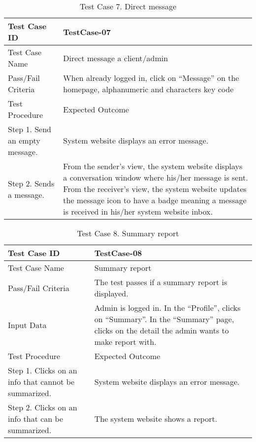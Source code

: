 \begin{table}[h!]   %
\centering
\caption{Test Case 7. Direct message} \vspace{0.25em}
\begin{tabular}{|p{2in}|p{4in}|} \hline
\centering 
Test Case ID & TestCase-07 \\ \hline
Test Case Name       &   Direct message a client/admin      \\ \hline
Pass/Fail Criteria       &   When already logged in, click on “Message” on the homepage, alphanumeric and characters key code    \\ \hline
Test Procedure   & Expected Outcome  \\ \hline
Step 1. Send an empty message.           &  System website displays an error message.      \\ \hline
Step 2. Sends a message.    & 	From the sender’s view, the system website displays a conversation window where his/her message is sent. From the receiver’s view, the system website updates the message icon to have a badge meaning a message is received in his/her system website inbox.     \\ \hline
\end{tabular}
\label{tab:test7}
\end{table}


\begin{table}[h!]   %
\centering
\caption{Test Case 8. Summary report} \vspace{0.25em}
\begin{tabular}{|p{2in}|p{4in}|} \hline
\centering 
Test Case ID & TestCase-08 \\ \hline
Test Case Name       &   Summary report       \\ \hline
Pass/Fail Criteria       &   The test passes if a summary report is displayed.    \\ \hline
Input Data  & Admin is logged in. In the “Profile”, clicks on “Summary”. In the “Summary” page, clicks on the detail the admin wants to make report with.    \\ \hline
Test Procedure   & Expected Outcome  \\ \hline
Step 1. Clicks on an info that cannot be summarized.            &  System website displays an error message.  \\ \hline
Step 2. Clicks on an info that can be summarized.      & 	The system website shows a report.  \\ \hline
\end{tabular}
\label{tab:test8}
\end{table}
%
%

